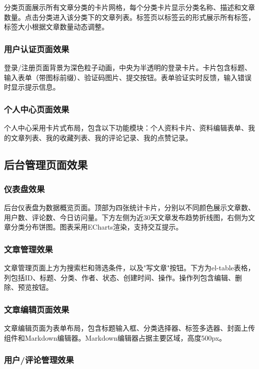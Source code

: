 \documentclass[12pt,a4paper]{article}
\begin{document}
分类页面展示所有文章分类的卡片网格，每个分类卡片显示分类名称、描述和文章数量。点击分类进入该分类下的文章列表。标签页以标签云的形式展示所有标签，标签大小根据文章数量动态调整。

\subsubsection{用户认证页面效果}

登录/注册页面背景为深色粒子动画，中央为半透明的登录卡片。卡片包含标题、输入表单（带图标前缀）、验证码图片、提交按钮。表单验证实时反馈，输入错误时显示提示信息。

\subsubsection{个人中心页面效果}

个人中心采用卡片式布局，包含以下功能模块：个人资料卡片、资料编辑表单、我的文章列表、我的收藏列表、我的评论记录、我的点赞记录。

\subsection{后台管理页面效果}

\subsubsection{仪表盘效果}

后台仪表盘为数据概览页面。顶部为四张统计卡片，分别以不同颜色展示文章数、用户数、评论数、今日访问量。下方左侧为近30天文章发布趋势折线图，右侧为文章分类分布饼图。图表采用ECharts渲染，支持交互提示。

\subsubsection{文章管理效果}

文章管理页面上方为搜索栏和筛选条件，以及"写文章"按钮。下方为el-table表格，列包括ID、标题、分类、作者、状态、创建时间、操作。操作列包含编辑、删除、预览按钮。

\subsubsection{文章编辑页面效果}

文章编辑页面为表单布局，包含标题输入框、分类选择器、标签多选器、封面上传组件和Markdown编辑器。Markdown编辑器占据主要区域，高度500px。

\subsubsection{用户/评论管理效果}
\end{document}
